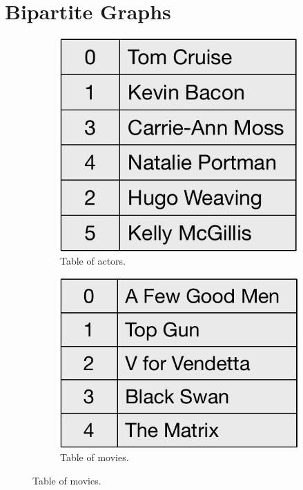 \section{Bipartite Graphs}
\label{sec:bipartite}

\begin{figure}[ht]
 \begin{subfigure}[t]{0.15\textwidth}
    \small
    \centering
    \includegraphics[width=0.825\linewidth]{figs/actor-table.pdf}
    \caption{\label{fig:actor-table}
    Table of actors.}
  \end{subfigure}
\hspace{1em}
   \begin{subfigure}[t]{0.167\textwidth}
    \small
    \centering
    \includegraphics[width=0.825\linewidth]{figs/movie-table.pdf}
    \caption{\label{fig:movie-table}
    Table of movies.}
  \end{subfigure}

\end{figure}
